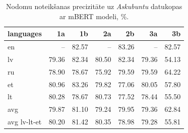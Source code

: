 \begin{table}[htbp]
  \centering
  \caption{Nodomu noteikšanas precizitāte uz \textit{Askubuntu} datukopas ar mBERT modeli, \%.}
    \begin{tabular}{lrrrrrr} \toprule
    languages & 1a & 1b & 2a & 2b & 3a & 3b \\\midrule
    en    &   --    & \cellcolor[rgb]{ .475,  .627,  .82}82.57 &  --     & \cellcolor[rgb]{ .357,  .545,  .78}83.26 &   --    & \cellcolor[rgb]{ .475,  .627,  .82}82.57 \\
    lv    & \cellcolor[rgb]{ .984,  .98,  .992}79.36 & \cellcolor[rgb]{ .514,  .655,  .835}82.34 & \cellcolor[rgb]{ .831,  .878,  .945}80.50 & \cellcolor[rgb]{ .514,  .655,  .835}82.34 & \cellcolor[rgb]{ .984,  .98,  .992}79.36 & \cellcolor[rgb]{ .973,  .412,  .42}54.13 \\
    ru    & \cellcolor[rgb]{ .984,  .973,  .98}78.90 & \cellcolor[rgb]{ .984,  .965,  .976}78.67 & \cellcolor[rgb]{ .984,  .902,  .914}75.92 & \cellcolor[rgb]{ .988,  .988,  1}79.59 & \cellcolor[rgb]{ .988,  .988,  1}79.59 & \cellcolor[rgb]{ .976,  .639,  .647}64.22 \\
    et    & \cellcolor[rgb]{ .753,  .824,  .918}80.96 & \cellcolor[rgb]{ .353,  .541,  .776}83.26 & \cellcolor[rgb]{ .949,  .961,  .988}79.82 & \cellcolor[rgb]{ .984,  .929,  .941}77.06 & \cellcolor[rgb]{ .91,  .933,  .973}80.05 & \cellcolor[rgb]{ .973,  .494,  .502}57.80 \\
    lt    & \cellcolor[rgb]{ .871,  .906,  .961}80.28 & \cellcolor[rgb]{ .984,  .965,  .976}78.67 & \cellcolor[rgb]{ .792,  .851,  .933}80.73 & \cellcolor[rgb]{ .984,  .941,  .949}77.52 & \cellcolor[rgb]{ .984,  .961,  .973}78.44 & \cellcolor[rgb]{ .973,  .439,  .451}55.50 \\\midrule
    avg   & \cellcolor[rgb]{ .941,  .957,  .984}79.87 & \cellcolor[rgb]{ .729,  .804,  .91}81.10 & \cellcolor[rgb]{ .984,  .98,  .992}79.24 & \cellcolor[rgb]{ .925,  .945,  .98}79.95 & \cellcolor[rgb]{ .984,  .98,  .992}79.36 & \cellcolor[rgb]{ .976,  .608,  .616}62.84 \\
    avg lv-lt-et & \cellcolor[rgb]{ .886,  .918,  .965}80.20 & \cellcolor[rgb]{ .675,  .769,  .89}81.42 & \cellcolor[rgb]{ .859,  .898,  .957}80.35 & \cellcolor[rgb]{ .984,  .973,  .984}78.98 & \cellcolor[rgb]{ .984,  .98,  .992}79.28 & \cellcolor[rgb]{ .973,  .447,  .455}55.81 \\\bottomrule
    \end{tabular}%
  \label{tab:askubuntu-bert}%
\end{table}%



